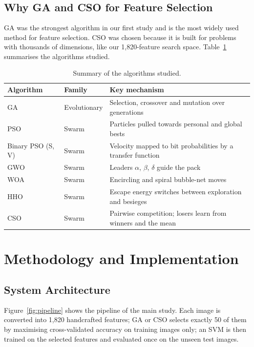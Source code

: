 \documentclass[12pt,a4paper]{report}
\begin{document}
\section{Why GA and CSO for Feature Selection}
GA was the strongest algorithm in our first study and is the most widely used method for feature selection. CSO was
chosen because it is built for problems with thousands of dimensions, like our 1,820-feature search space.
Table~\ref{tab:algos} summarises the algorithms studied.

\begin{table}[H]
\centering
\caption{Summary of the algorithms studied.}
\label{tab:algos}
\small
\begin{tabularx}{\textwidth}{|l|l|X|}
\hline
\textbf{Algorithm} & \textbf{Family} & \textbf{Key mechanism} \\
\hline
GA & Evolutionary & Selection, crossover and mutation over generations \\
\hline
PSO & Swarm & Particles pulled towards personal and global bests \\
\hline
Binary PSO (S, V) & Swarm & Velocity mapped to bit probabilities by a transfer function \\
\hline
GWO & Swarm & Leaders $\alpha$, $\beta$, $\delta$ guide the pack \\
\hline
WOA & Swarm & Encircling and spiral bubble-net moves \\
\hline
HHO & Swarm & Escape energy switches between exploration and besieges \\
\hline
CSO & Swarm & Pairwise competition; losers learn from winners and the mean \\
\hline
\end{tabularx}
\end{table}

\chapter{Methodology and Implementation}

\section{System Architecture}
Figure~\ref{fig:pipeline} shows the pipeline of the main study. Each image is converted into 1,820 handcrafted
features; GA or CSO selects exactly 50 of them by maximising cross-validated accuracy on training images only; an
SVM is then trained on the selected features and evaluated once on the unseen test images.
\end{document}
